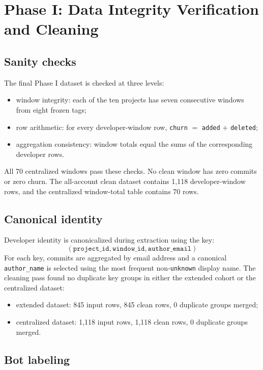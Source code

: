 \section{Phase I: Data Integrity Verification and Cleaning}
\label{sec:phase1_cleaning}

\subsection{Sanity checks}
\label{sec:phase1_sanity}

The final Phase I dataset is checked at three levels:
\begin{itemize}[leftmargin=*]
  \item window integrity: each of the ten projects has seven consecutive windows from eight frozen tags;
  \item row arithmetic: for every developer-window row, \texttt{churn} $=$ \texttt{added} $+$ \texttt{deleted};
  \item aggregation consistency: window totals equal the sums of the corresponding developer rows.
\end{itemize}

All 70 centralized windows pass these checks. No clean window has zero commits or zero churn. The all-account clean dataset
contains 1{,}118 developer-window rows, and the centralized window-total table contains 70 rows.

\subsection{Canonical identity}
\label{sec:phase1_dedup}

Developer identity is canonicalized during extraction using the key:
\[
(\texttt{project\_id}, \texttt{window\_id}, \texttt{author\_email})
\]
For each key, commits are aggregated by email address and a canonical \texttt{author\_name} is selected using the most frequent
non-\texttt{unknown} display name. The cleaning pass found no duplicate key groups in either the extended cohort or the centralized
dataset:
\begin{itemize}[leftmargin=*]
  \item extended dataset: 845 input rows, 845 clean rows, 0 duplicate groups merged;
  \item centralized dataset: 1{,}118 input rows, 1{,}118 clean rows, 0 duplicate groups merged.
\end{itemize}

\subsection{Bot labeling}
\label{sec:phase1_bots}

